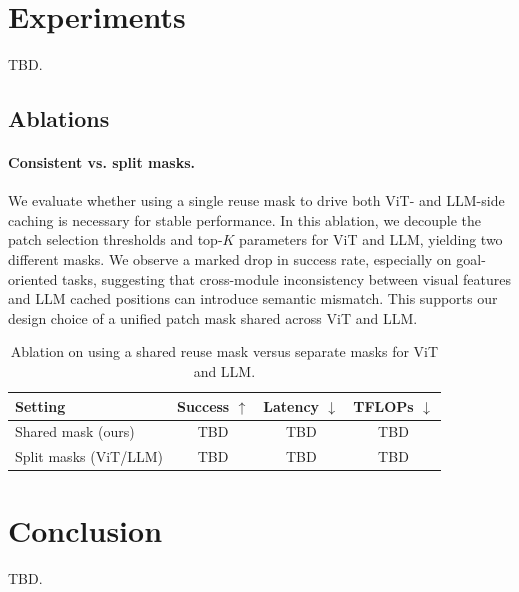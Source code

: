 \documentclass[11pt]{article}
\begin{document}
\section{Experiments}
TBD.
\subsection{Ablations}
\paragraph{Consistent vs. split masks.} We evaluate whether using a single reuse mask to drive both ViT- and LLM-side caching is necessary for stable performance. In this ablation, we decouple the patch selection thresholds and top-$K$ parameters for ViT and LLM, yielding two different masks. We observe a marked drop in success rate, especially on goal-oriented tasks, suggesting that cross-module inconsistency between visual features and LLM cached positions can introduce semantic mismatch. This supports our design choice of a unified patch mask shared across ViT and LLM.

\begin{table}[t]
\centering
\begin{tabular}{lccc}
\hline
\textbf{Setting} & \textbf{Success $\uparrow$} & \textbf{Latency $\downarrow$} & \textbf{TFLOPs $\downarrow$} \\
\hline
Shared mask (ours) & TBD & TBD & TBD \\
Split masks (ViT/LLM) & TBD & TBD & TBD \\
\hline
\end{tabular}
\caption{Ablation on using a shared reuse mask versus separate masks for ViT and LLM.}
\label{tab:ablation_mask}
\end{table}

\section{Conclusion}
TBD.



\end{document}
